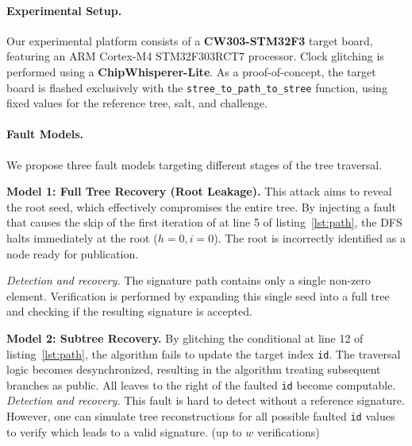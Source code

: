 \paragraph{Experimental Setup.}
Our experimental platform consists of a \textbf{CW303-STM32F3} target board, featuring an ARM Cortex-M4 STM32F303RCT7 processor. Clock glitching is performed using a \textbf{ChipWhisperer-Lite}. As a proof-of-concept, the target board is flashed exclusively with the \texttt{stree\_to\_path\_to\_stree} function, using fixed values for the reference tree, salt, and challenge.

\paragraph{Fault Models.}
We propose three fault models targeting different stages of the tree traversal.

\noindent\textbf{Model 1: Full Tree Recovery (Root Leakage).}
This attack aims to reveal the root seed, which effectively compromises the entire tree. By injecting a fault that causes the skip of the first iteration of  at line 5 of listing~\ref{lst:path}, the DFS halts immediately at the root ($h=0, i=0$). The root is incorrectly identified as a node ready for publication.

\noindent\textit{Detection and recovery.} The signature path contains only a single non-zero element. Verification is performed by expanding this single seed into a full tree and checking if the resulting signature is accepted.

\noindent\textbf{Model 2: Subtree Recovery.}
By glitching the conditional  at line 12 of listing~\ref{lst:path}, the algorithm fails to update the target index \texttt{id}. The traversal logic becomes desynchronized, resulting in the algorithm treating subsequent branches as public. All leaves to the right of the faulted \texttt{id} become computable.
\noindent\textit{Detection and recovery. } This fault is hard to detect without a reference signature. However, one can simulate tree reconstructions for all possible faulted \texttt{id} values to verify which leads to a valid signature. (up to $w$ verifications)

